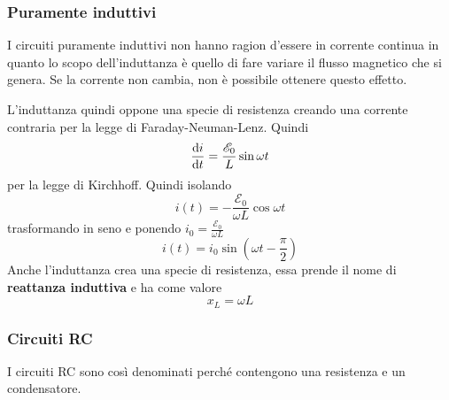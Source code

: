 \subsubsection{Puramente induttivi}
I circuiti puramente induttivi non hanno ragion d'essere in corrente continua in quanto lo scopo
dell'induttanza è quello di fare variare il flusso magnetico che si genera. Se la corrente non
cambia, non è possibile ottenere questo effetto.
\begin{center}
\end{center}
L'induttanza quindi oppone una specie di resistenza creando una corrente contraria per la legge di 
Faraday-Neuman-Lenz. Quindi
\begin{equation*}
  \frac{\mathop{}\!\mathrm{d} i}{\mathop{}\!\mathrm{d} t} = \frac{\mathcal{E}_0}{L}\sin\omega t
\end{equation*}
per la legge di Kirchhoff. Quindi isolando
\begin{equation*}
  i(t) = -\frac{\mathcal{E}_0}{\omega L}\cos\omega t
\end{equation*}
trasformando in seno e ponendo $i_0=\frac{\mathcal{E}_0}{\omega L}$
\begin{equation*}
  i(t) = i_0\sin \left( \omega t-\frac{\pi}{2} \right)
\end{equation*}
Anche l'induttanza crea una specie di resistenza, essa prende il nome di 
\textbf{reattanza induttiva} e ha come valore
\begin{equation*}
  x_L = \omega L
\end{equation*}

\subsubsection{Circuiti RC}
I circuiti RC sono così denominati perché contengono una resistenza e un condensatore.
\begin{center}
\end{center}
